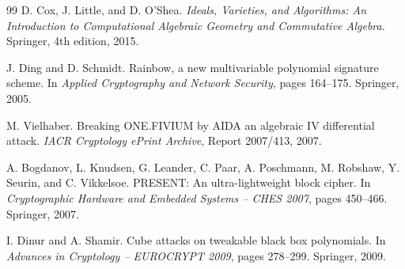 \documentclass[12pt,a4paper]{article}
\begin{document}
\begin{thebibliography}{99}
D. Cox, J. Little, and D. O'Shea.
\newblock \emph{Ideals, Varieties, and Algorithms: An Introduction to Computational Algebraic Geometry and Commutative Algebra}.
\newblock Springer, 4th edition, 2015.

J. Ding and D. Schmidt.
\newblock Rainbow, a new multivariable polynomial signature scheme.
\newblock In \emph{Applied Cryptography and Network Security}, pages 164--175. Springer, 2005.

M. Vielhaber.
\newblock Breaking ONE.FIVIUM by AIDA an algebraic IV differential attack.
\newblock \emph{IACR Cryptology ePrint Archive}, Report 2007/413, 2007.

A. Bogdanov, L. Knudsen, G. Leander, C. Paar, A. Poschmann, M. Robshaw, Y. Seurin, and C. Vikkelsoe.
\newblock PRESENT: An ultra-lightweight block cipher.
\newblock In \emph{Cryptographic Hardware and Embedded Systems -- CHES 2007}, pages 450--466. Springer, 2007.

I. Dinur and A. Shamir.
\newblock Cube attacks on tweakable black box polynomials.
\newblock In \emph{Advances in Cryptology -- EUROCRYPT 2009}, pages 278--299. Springer, 2009.

\end{thebibliography}
\end{document}
